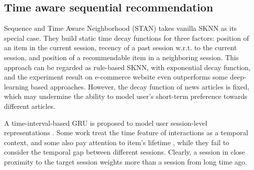 \subsection{Time aware sequential recommendation}
Sequence and Time Aware Neighborhood (STAN) \cite{garg2019sequence} takes vanilla SKNN as its special case. They build static time decay functions for three factors: position of an item in the current session, recency of a past session w.r.t. to the current session, and position of a recommendable item in a neighboring session. This approach can be regarded as rule-based SKNN, with exponential decay function, and the experiment result on e-commerce
website even outperforms some deep-learning based approaches. However, the decay function of news articles is fixed, which may undermine the ability to model user's short-term preference towards different articles.

A time-interval-based GRU is proposed to model user session-level representations \cite{lei_tissa_2019}. Some work \cite{rakkappan2019context, xu2019time, wu_recommender_2019} treat the time feature of interactions as a temporal context, and some also pay attention to item's lifetime \cite{wang_modeling_2019}, while they fail to consider the temporal gap between different sessions. Clearly, a session in close proximity to the target session weights more than a session from long time ago.

